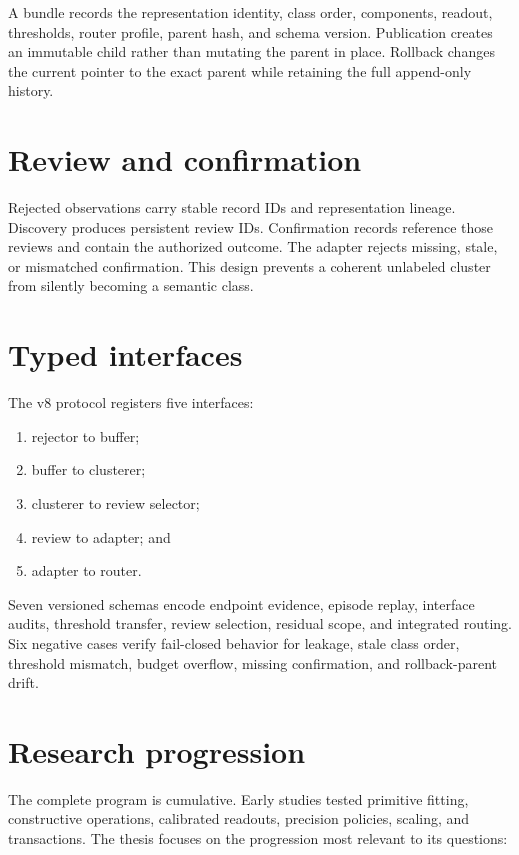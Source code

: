 \documentclass[12pt,oneside]{report}
\begin{document}
A bundle records the representation identity, class order, components,
readout, thresholds, router profile, parent hash, and schema version.
Publication creates an immutable child rather than mutating the parent in
place. Rollback changes the current pointer to the exact parent while retaining
the full append-only history.

\section{Review and confirmation}

Rejected observations carry stable record IDs and representation lineage.
Discovery produces persistent review IDs. Confirmation records reference those
reviews and contain the authorized outcome. The adapter rejects missing,
stale, or mismatched confirmation. This design prevents a coherent unlabeled
cluster from silently becoming a semantic class.

\section{Typed interfaces}

The v8 protocol registers five interfaces:

\begin{enumerate}
\item rejector to buffer;
\item buffer to clusterer;
\item clusterer to review selector;
\item review to adapter; and
\item adapter to router.
\end{enumerate}

Seven versioned schemas encode endpoint evidence, episode replay, interface
audits, threshold transfer, review selection, residual scope, and integrated
routing. Six negative cases verify fail-closed behavior for leakage, stale
class order, threshold mismatch, budget overflow, missing confirmation, and
rollback-parent drift.

\section{Research progression}

The complete program is cumulative. Early studies tested primitive fitting,
constructive operations, calibrated readouts, precision policies, scaling, and
transactions. The thesis focuses on the progression most relevant to its
questions:
\end{document}
